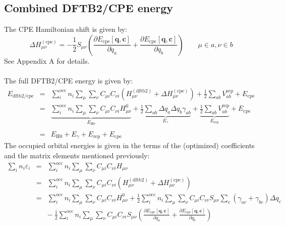 \documentclass{article}
\numberwithin{equation}{section}
\begin{document}
\subsection{Combined DFTB2/CPE energy}
The CPE Hamiltonian shift is given by:\cite{gieseyork2012}
\begin{equation}
    \Delta H_{\mu\nu}^{\mathrm{(cpe)}} =  - \frac{1}{2} S_{\mu\nu} \left(
    \frac{\partial E_{\mathrm{cpe}}\left[\mathbf{q}, \mathbf{c}\right]}{\partial q_a} +
    \frac{\partial E_{\mathrm{cpe}}\left[\mathbf{q}, \mathbf{c}\right]}{\partial q_b}
\right) \qquad \mu \in a, \nu \in b
\end{equation}
See Appendix A for details.
\\\\The full DFTB2/CPE energy is given by:
\begin{eqnarray}
    E_\mathrm{{dftb2/cpe}} &=& \sum_i^\mathrm{occ} n_i \sum_{\mu} \sum_{\nu}  C_{\mu i} C_{\nu i} \left(H_{\mu\nu}^{\mathrm{(dftb2)}} + \Delta H_{\mu\nu}^{\mathrm{(cpe)}} \right) 
    + \frac{1}{2} \sum_{ab} V^\mathrm{rep}_{ab}
    + E_{\mathrm{cpe}} \nonumber\\
    &=& \underbrace{\sum_i^\mathrm{occ} n_i  \sum_\mu \sum_\nu C_{\mu i}  C_{\nu i} H^0_{\mu\nu}}_{E_\mathrm{H0}}
        + \underbrace{\frac{1}{2} \sum_{ab} \Delta q_a \Delta q_b \gamma_{ab}}_{E_\gamma}
    + \underbrace{\frac{1}{2} \sum_{ab} V^\mathrm{rep}_{ab}}_{E_\mathrm{rep}}
 + E_{\mathrm{cpe}}\\\nonumber\\
&=&  E_\mathrm{H0} + E_\gamma + E_\mathrm{rep} + E_\mathrm{cpe}\label{eq:shorthand}
\end{eqnarray}
The occupied orbital energies is given in the terms of the (optimized) coefficients and the matrix elements mentioned previously:
\begin{eqnarray}
    \sum_i n_i \varepsilon_i 
    &=& \sum_i^\mathrm{occ} n_i \sum_{\mu} \sum_{\nu}  C_{\mu i} C_{\nu i} H_{\mu\nu}\nonumber\\
    &=& \sum_i^\mathrm{occ} n_i \sum_{\mu} \sum_{\nu}  C_{\mu i} C_{\nu i} \left(H_{\mu\nu}^{\mathrm{(dftb2)}} + \Delta H_{\mu\nu}^{\mathrm{(cpe)}} \right)\nonumber\\
    &=& \sum_i^\mathrm{occ} n_i \sum_{\mu} \sum_{\nu}  C_{\mu i} C_{\nu i} H_{\mu\nu}^0
    + \frac{1}{2} \sum_i^\mathrm{occ} n_i \sum_{\mu} \sum_{\nu}  C_{\mu i} C_{\nu i} S_{\mu\nu} \sum_c \left( \gamma_{ac} + \gamma_{bc} \right)\Delta q_c \nonumber\\
    && -\ \frac{1}{2} \sum_i^\mathrm{occ} n_i \sum_{\mu} \sum_{\nu}  C_{\mu i} C_{\nu i} S_{\mu\nu} \left(
    \frac{\partial E_{\mathrm{cpe}}\left[\mathbf{q}, \mathbf{c}\right]}{\partial q_a} +
    \frac{\partial E_{\mathrm{cpe}}\left[\mathbf{q}, \mathbf{c}\right]}{\partial q_b} \right)\label{eq:orbital_energies}
\end{eqnarray}
\end{document}
